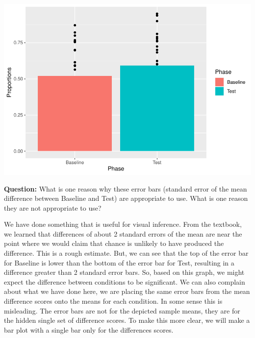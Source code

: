 \documentclass[]{book}
\begin{document}
\includegraphics{Statistics_Lab_files/figure-latex/unnamed-chunk-177-1.pdf}

\textbf{Question:} What is one reason why these error bars (standard
error of the mean difference between Baseline and Test) are appropriate
to use. What is one reason they are not appropriate to use?

We have done something that is useful for visual inference. From the
textbook, we learned that differences of about 2 standard errors of the
mean are near the point where we would claim that chance is unlikely to
have produced the difference. This is a rough estimate. But, we can see
that the top of the error bar for Baseline is lower than the bottom of
the error bar for Test, resulting in a difference greater than 2
standard error bars. So, based on this graph, we might expect the
difference between conditions to be significant. We can also complain
about what we have done here, we are placing the same error bars from
the mean difference scores onto the means for each condition. In some
sense this is misleading. The error bars are not for the depicted sample
means, they are for the hidden single set of difference scores. To make
this more clear, we will make a bar plot with a single bar only for the
differences scores.
\end{document}
